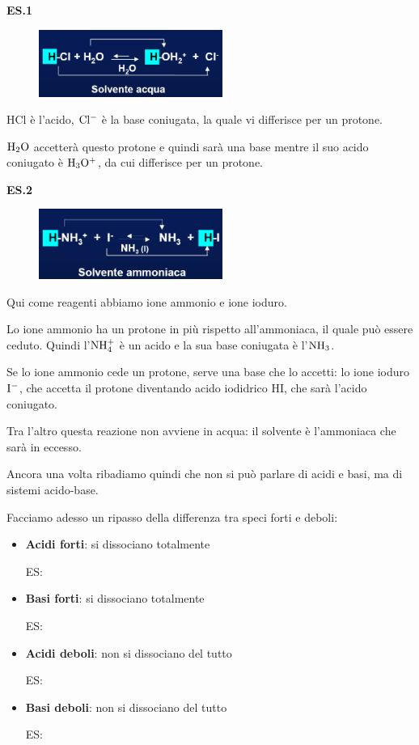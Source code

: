 \vspace{0.2cm}\textbf{ES.1}
\begin{figure}[H]
    \centering
    \includegraphics[width=6cm]{immagini/acido_base_coniugata_es1.png}
\end{figure}

HCl è l'acido, $\rm Cl^-$ è la base coniugata, la quale vi differisce per un protone.

$\rm H_2O$ accetterà questo protone e quindi sarà una base mentre il suo acido coniugato è $\rm H_3O^+$, da cui differisce per un protone.

\vspace{0.2cm}\textbf{ES.2}
\begin{figure}[H]
    \centering
    \includegraphics[width=6cm]{immagini/acido_base_coniugata_es2.png}
\end{figure}

Qui come reagenti abbiamo ione ammonio e ione ioduro.

Lo ione ammonio ha un protone in più rispetto all'ammoniaca, il quale può essere ceduto. Quindi l'$\rm NH_4^+$ è un acido e la sua base coniugata è l'$\rm NH_3$.

Se lo ione ammonio cede un protone, serve una base che lo accetti: lo ione ioduro $\rm I^-$, che accetta il protone diventando acido iodidrico HI, che sarà l'acido coniugato.

Tra l'altro questa reazione non avviene in acqua: il solvente è l'ammoniaca che sarà in eccesso.

Ancora una volta ribadiamo quindi che non si può parlare di acidi e basi, ma di sistemi acido-base.

\vspace{0.2cm}Facciamo adesso un ripasso della differenza tra speci forti e deboli:

\begin{itemize}
    \item \textbf{Acidi forti}: si dissociano totalmente
    
    ES: 
    \item \textbf{Basi forti}: si dissociano totalmente
    
    ES: 
    \item \textbf{Acidi deboli}: non si dissociano del tutto
    
    ES: 
    \item \textbf{Basi deboli}: non si dissociano del tutto
    
    ES: 
\end{itemize}

